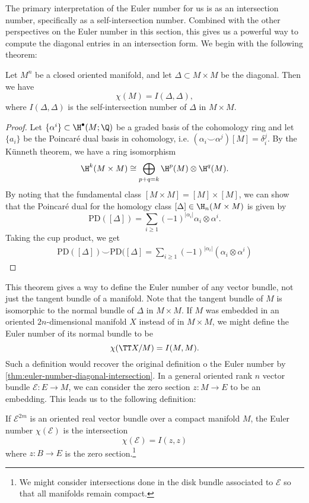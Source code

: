 The primary interpretation of the Euler number for us is as an intersection number, specifically as a self-intersection number. Combined with the other perspectives on the Euler number in this section, this gives us a powerful way to compute the diagonal entries in an intersection form. We begin with the following theorem: 
\begin{theorem}\label{thm:euler-number-diagonal-intersection}
  Let $M^n$ be a closed oriented manifold, and let $\Delta\subset M\times M$ be the diagonal. 
  Then we have
  \[
    \chi(M) = I(\Delta, \Delta),
  \]
  where $I(\Delta,\Delta)$ is the self-intersection number of $\Delta$ in $M\times M$.
\end{theorem}
\begin{proof}
  Let $\{\alpha^i\}\subset \H^\bullet(M; \Q)$ be a graded basis of the cohomology ring and let $\{a_i\}$ be the Poincar\'e dual basis in cohomology, i.e. $(\alpha_i\smile \alpha^j)[M]=\delta^j_i$. By the K\"unneth theorem, we have a ring isomorphism
  \[
    \H^{k}(M\times M) \cong \bigoplus_{p+q=k} \H^p(M)\otimes \H^q(M).
  \]
  By noting that the fundamental class $[M\times M]=[M]\times [M]$, we can show that the Poincar\'e dual for the homology class $[\Delta]\in \H_{n}(M\times M)$ is given by
  \[
      \mathrm{PD}([\Delta]) = \sum_{i\geq 1}(-1)^{|\alpha_i|}\alpha_i\otimes \alpha^i.
  \]
  Taking the cup product, we get
  \[
    \begin{aligned}
      \mathrm{PD}([\Delta])\smile \mathrm{PD}([\Delta] = \sum_{i\geq 1}(-1)^{|\alpha_i|}(\alpha_i\otimes \alpha^i)
    \end{aligned}
  \]
\end{proof}

This theorem gives a way to define the Euler number of any vector bundle, not just the tangent bundle of a manifold. Note that the tangent bundle of $M$ is isomorphic to the normal bundle of $\Delta$ in $M\times M$. If $M$ was embedded in an oriented $2n$-dimensional manifold $X$ instead of in $M\times M$, we might define the Euler number of its normal bundle to be
\[
    \chi(\TT X/M) = I(M,M).
\]
Such a definition would recover the original definition o the Euler number by \cref{thm:euler-number-diagonal-intersection}. In a general oriented rank $n$ vector bundle $\mathcal{E} : E \to M$, we can consider the zero section $z : M \to E$ to be an embedding. This leads us to the following definition:

\begin{definition}\label{def:euler-number-self-intersection}
  If $\mathcal{E}^{2m}$ is an oriented real vector bundle over a compact manifold $M$, 
	the Euler number $\chi(\mathcal{E})$ is the intersection
	\[
		\chi(\mathcal{E}) = I(z,z)
	\]
	where $z : B \to E$ is the zero section.\footnote{We might consider intersections done in the disk bundle associated to $\mathcal{E}$ so that all manifolds remain compact.}
\end{definition}

